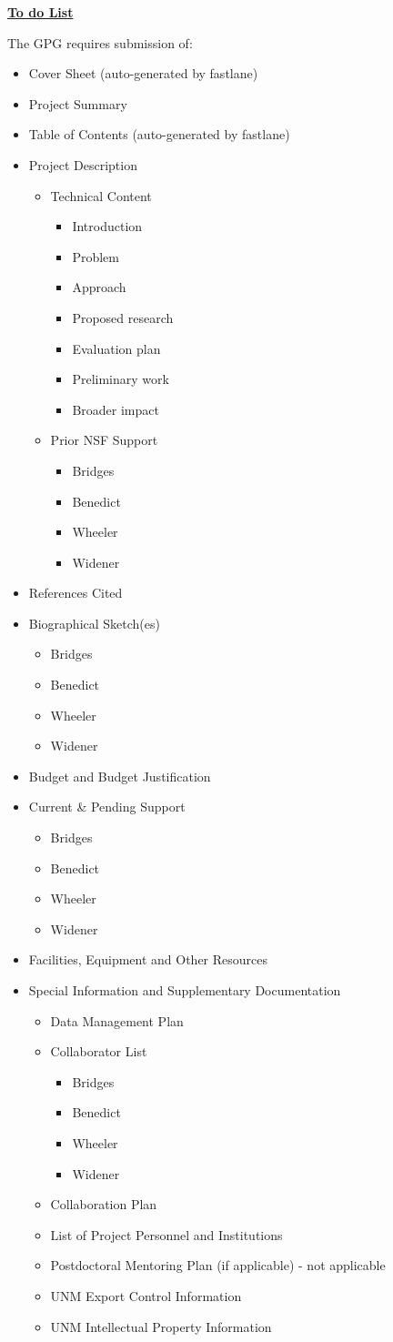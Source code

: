 \documentclass[10pt]{article}
\newcommand*\yes{\item[\color{Green}\ding{51}]}
\newcommand*\no{\item[\color{Red}\ding{55}]}
\begin{document}
{\color{BrickRed} \underline{\textbf{{\Large To do List}}}}

The GPG requires submission of: 
\begin{itemize}
  \yes Cover Sheet (auto-generated by fastlane)

  \no Project Summary

  \yes Table of Contents (auto-generated by fastlane)

  \no Project Description
  \begin{itemize}
	\no Technical Content
	\begin{itemize}
		\no Introduction
		\no Problem
		\no Approach
		\no Proposed research
		\no Evaluation plan
		\no Preliminary work
		\no Broader impact
	\end{itemize}
	\no Prior NSF Support
  	\begin{itemize}
		\no Bridges
		\no Benedict
		\no Wheeler
		\no Widener
  	\end{itemize}
  \end{itemize}

  \no References Cited

  \no Biographical Sketch(es)
	\begin{itemize}
		\no Bridges
		\no Benedict
		\no Wheeler
		\no Widener
	\end{itemize}
  \no Budget and Budget Justification
  \no Current \& Pending Support
	\begin{itemize}
		\no Bridges
		\no Benedict
		\no Wheeler
		\no Widener
	\end{itemize}
  \no Facilities, Equipment and Other Resources
  \no Special Information and Supplementary Documentation
  \begin{itemize}
    \no Data Management Plan
    \no Collaborator List
    \begin{itemize}
		\no Bridges
		\no Benedict
		\no Wheeler
		\no Widener
    \end{itemize}
    \yes Collaboration Plan
    \no List of Project Personnel and Institutions
    \yes Postdoctoral Mentoring Plan (if applicable) - not applicable
    \no UNM Export Control Information
    \no UNM Intellectual Property Information
  \end{itemize}
\end{itemize}
\end{document}
